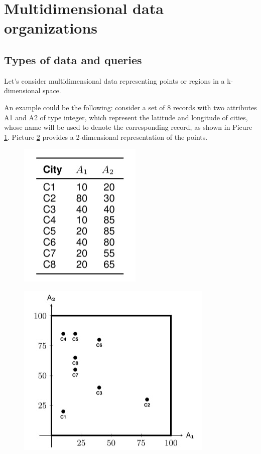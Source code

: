 \section{Multidimensional data organizations}

\subsection{Types of data and queries}

Let's consider multidimensional data representing points or regions in a k-dimensional space.

An example could be the following: consider a set of 8 records with two attributes A1 and A2 of type integer, which represent the latitude and longitude of cities, whose name will be used to denote the corresponding record, as shown in Picure \ref{multi_1}. Picture \ref{multi_2} provides a 2-dimensional representation of the points.

\begin{figure}[h!]
		\centering
		\includegraphics[scale = 1.5]{img/multi_1.jpg}
		\label{multi_1}
\end{figure}

\begin{figure}[h!]
		\centering
		\includegraphics[scale = 1.5]{img/multi_2.jpg}
		\label{multi_2}
\end{figure}

